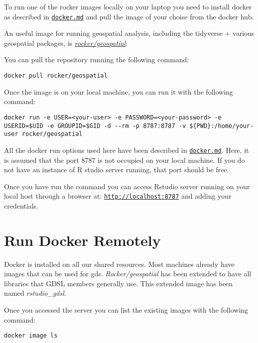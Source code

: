 \documentclass[
]{book}
\begin{document}
To run one of the rocker images locally on your laptop you need to install docker as described in \href{06_docker.md}{\texttt{docker.md}} and pull the image of your choise from the docker hub.

An useful image for running geospatial analysis, including the tidyverse + various geospatial packages, is \href{https://hub.docker.com/r/rocker/geospatial}{\emph{rocker/geospatial}}:

You can pull the repository running the following command:

\begin{verbatim}
docker pull rocker/geospatial
\end{verbatim}

Once the image is on your local machine, you can run it with the following command:

\begin{verbatim}
docker run -e USER=<your-user> -e PASSWORD=<your-password> -e USERID=$UID -e GROUPID=$GID -d --rm -p 8787:8787 -v ${PWD}:/home/your-user rocker/geospatial
\end{verbatim}

All the docker run options used here have been described in \href{06_docker.md}{\texttt{docker.md}}. Here, it is assumed that the port 8787 is not occupied on your local machine. If you do not have an instance of R studio server running, that port should be free.

Once you have run the command you can access Rstudio server running on your local host through a browser at: \href{http://localhost:8787}{\texttt{http://localhost:8787}} and adding your credentials.

\hypertarget{run-docker-remotely}{%
\section{Run Docker Remotely}\label{run-docker-remotely}}

Docker is installed on all our shared resources. Most machines already have images that can be used for gds. \emph{Rocker/geospatial} has been extended to have all libraries that GDSL members generally use. This extended image has been named \emph{rstudio\_gdsl}.

Once you accessed the server you can list the existing images with the following command:

\begin{verbatim}
docker image ls
\end{verbatim}
\end{document}
